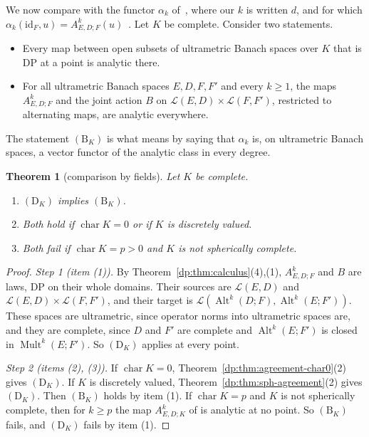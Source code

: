 \documentclass[11pt]{amsart}
\newtheorem{theorem}{Theorem}[section]
\theoremstyle{definition}
\theoremstyle{remark}
\numberwithin{equation}{section}
\newcommand{\cL}{\mathcal L}
\newcommand{\Alt}{\operatorname{Alt}}
\newcommand{\Mult}{\operatorname{Mult}}
\newcommand{\id}{\mathrm{id}}
\theoremstyle{plain}
\theoremstyle{definition}
\theoremstyle{plain}
\begin{document}
We now compare with the functor $\alpha_k$ of~\cite[n\textsuperscript{o}~7.8.1]{Bou}, where our $k$ is written $d$, and for which $\alpha_k(\id_F,u)=A^k_{E,D;F}(u)$~\cite[Section~10.2]{I}. Let $K$ be complete. Consider two statements.
\begin{itemize}
\item[$(\mathrm D_K)$] Every map between open subsets of ultrametric Banach spaces over $K$ that is DP at a point is analytic there.
\item[$(\mathrm B_K)$] For all ultrametric Banach spaces $E,D,F,F'$ and every $k\ge1$, the maps $A^k_{E,D;F}$ and the joint action $B$ on $\cL(E,D)\times\cL(F,F')$, restricted to alternating maps, are analytic everywhere.
\end{itemize}
The statement $(\mathrm B_K)$ is what \cite[paragraph \emph{Bourbaki's question}, and the proof of Corollary~10.5]{I} means by saying that $\alpha_k$ is, on ultrametric Banach spaces, a vector functor of the analytic class in every degree.

\begin{theorem}[comparison by fields]\label{dp:thm:field-level}
Let $K$ be complete.
\begin{enumerate}
\item $(\mathrm D_K)$ implies $(\mathrm B_K)$.
\item Both hold if $\operatorname{char}K=0$ or if $K$ is discretely valued.
\item Both fail if $\operatorname{char}K=p>0$ and $K$ is not spherically complete.
\end{enumerate}
\end{theorem}

\begin{proof}
\emph{Step 1 (item (1)).} By Theorem~\ref{dp:thm:calculus}(4),(1), $A^k_{E,D;F}$ and $B$ are laws, DP on their whole domains. Their sources are $\cL(E,D)$ and $\cL(E,D)\times\cL(F,F')$, and their target is $\cL(\Alt^k(D;F),\Alt^k(E;F'))$. These spaces are ultrametric, since operator norms into ultrametric spaces are, and they are complete, since $D$ and $F'$ are complete and $\Alt^k(E;F')$ is closed in $\Mult^k(E;F')$. So $(\mathrm D_K)$ applies at every point.

\emph{Step 2 (items (2), (3)).} If $\operatorname{char}K=0$, Theorem~\ref{dp:thm:agreement-char0}(2) gives $(\mathrm D_K)$. If $K$ is discretely valued, Theorem~\ref{dp:thm:sph-agreement}(2) gives $(\mathrm D_K)$. Then $(\mathrm B_K)$ holds by item (1). If $\operatorname{char}K=p$ and $K$ is not spherically complete, then for $k\ge p$ the map $A^k_{E,D;K}$ of \cite[Theorem~7.2(2)]{I} is analytic at no point. So $(\mathrm B_K)$ fails, and $(\mathrm D_K)$ fails by item (1).
\end{proof}
\end{document}
